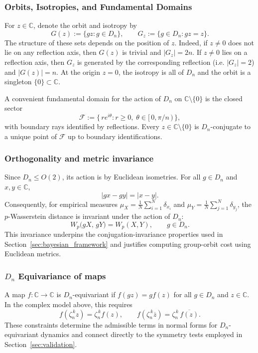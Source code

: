 \documentclass[11pt]{amsart}
\def\bc{{\mathbb{C}}}
\begin{document}
\subsubsection{Orbits, Isotropies, and Fundamental Domains}
For $z \in \bc$, denote the orbit and isotropy by
\[
G(z) := \{ g z : g \in D_n \}, 
\qquad 
G_z := \{ g \in D_n : g z = z \}.
\]
The structure of these sets depends on the position of $z$. Indeed, if $z \neq 0$ does not lie on any reflection axis, then $G(z)$ is trivial and $|G_z| = 2n$. If $z \neq 0$ lies on a reflection axis, then $G_z$ is generated by the corresponding reflection (i.e. $|G_z| = 2$) and $|G(z)| = n$. At the origin $z=0$, the isotropy is all of $D_n$ and the orbit is a singleton $\{0\} \subset \bc$.

A convenient fundamental domain for the action of $D_n$ on $\bc\setminus\{0\}$ is the closed sector
\[
\mathcal{F} := \bigl\{\, r e^{i\theta} : r \ge 0,\; \theta \in [\,0,\pi/n\,) \,\bigr\},
\]
with boundary rays identified by reflections. Every $z \in \bc\setminus\{0\}$ is $D_n$-conjugate to a unique point of $\mathcal{F}$ up to boundary identifications. 

\subsubsection{Orthogonality and metric invariance}
Since $D_n \leq O(2)$, its action is by Euclidean isometries. For all $g \in D_n$ and $x,y \in \bc$,
\[
|g x - g y| = |x - y|.
\]
Consequently, for empirical measures $\mu_X = \tfrac{1}{N}\sum_{i=1}^N \delta_{x_i}$ and $\mu_Y = \tfrac{1}{N}\sum_{j=1}^N \delta_{y_j}$, the $p$-Wasserstein distance is invariant under the action of $D_n$:
\[
W_p\bigl(gX,\, gY\bigr) = W_p(X,Y), \qquad g \in D_n.
\]
This invariance underpins the conjugation-invariance properties used in Section~\ref{sec:bayesian_framework} and justifies computing group-orbit cost using Euclidean metrics.

\subsubsection{$D_n$ Equivariance of maps}
A map $f:\bc\to\bc$ is $D_n$-equivariant if $f(g z) = g f(z)$ for all $g \in D_n$ and $z \in \bc$. In the complex model above, this requires
\[
f(\zeta_n^{\,k} z) = \zeta_n^{\,k} f(z), 
\qquad 
f(\zeta_n^{\,k} \overline{z}) = \zeta_n^{\,k}\, \overline{f(z)}.
\]
These constraints determine the admissible terms in normal forms for $D_n$-equivariant dynamics and connect directly to the symmetry tests employed in Section~\ref{sec:validation}.
\end{document}

